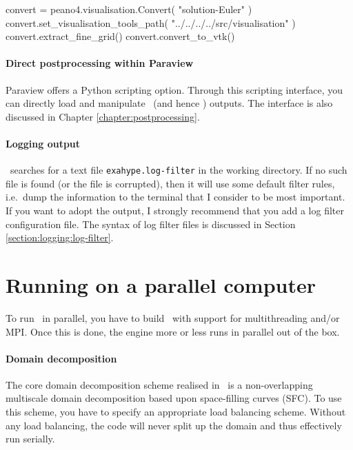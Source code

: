 \begin{code}
convert = peano4.visualisation.Convert( "solution-Euler" )
convert.set_visualisation_tools_path( "../../../../src/visualisation" )
convert.extract_fine_grid()
convert.convert_to_vtk()
\end{code}


\paragraph{Direct postprocessing within Paraview}

Paraview offers a Python scripting option. 
Through this scripting interface, you can directly load and manipulate \Peano\
(and hence \ExaHyPE) outputs. 
The interface is also discussed in Chapter
\ref{chapter:postprocessing}.


\paragraph{Logging output}

\ExaHyPE\ searches for a text file \texttt{exahype.log-filter} in the working
directory.
If no such file is found (or the file is corrupted), then it will use some
default filter rules, i.e.~dump the information to the terminal that I consider
to be most important.
If you want to adopt the output, I strongly recommend that you add a log filter
configuration file. 
The syntax of log filter files is discussed in Section
\ref{section:logging:log-filter}.



\section{Running on a parallel computer}

To run \ExaHyPE\ in parallel, you have to build \Peano\ with support for
multithreading and/or MPI.
Once this is done, the engine more or less runs in parallel out of the box.


\paragraph{Domain decomposition}
The core domain decomposition scheme realised in \ExaHyPE\ is a non-overlapping
multiscale domain decomposition based upon space-filling curves (SFC).
To use this scheme, you have to specify an appropriate load balancing scheme.
Without any load balancing, the code will never split up the domain and thus
effectively run serially.


